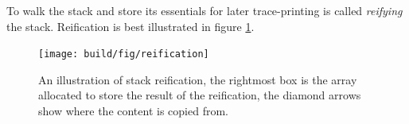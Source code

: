 To walk the stack and store its essentials for later trace-printing is
called \emph{reifying} the stack. Reification is best illustrated in figure \ref{fig:reification}.

\begin{figure}
\begin{mdframed}
  \texttt{[image: build/fig/reification]}
  \caption{An illustration of stack reification, the rightmost box
  is the array allocated to store the result of the reification, the
  diamond arrows show where the content is copied from.}
  \label{fig:reification}
\end{mdframed}
\end{figure}



